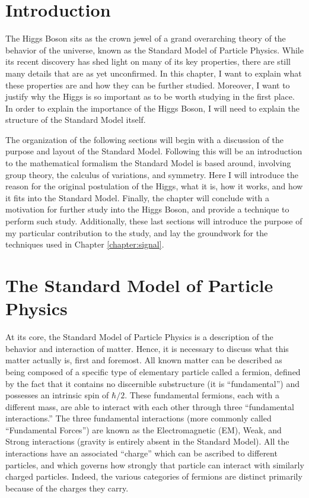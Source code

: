 \section{Introduction}

    The Higgs Boson sits as the crown jewel of a grand overarching theory of the behavior of the universe,
        known as the Standard Model of Particle Physics.
    While its recent discovery has shed light on many of its key properties,
        there are still many details that are as yet unconfirmed.
    In this chapter, I want to explain what these properties are and how they can be further studied.
    Moreover, I want to justify why the Higgs is so important as to be worth studying in the first place.
    In order to explain the importance of the Higgs Boson,
        I will need to explain the structure of the Standard Model itself.

    The organization of the following sections will begin with a discussion of the purpose and layout of the Standard Model.
    Following this will be an introduction to the mathematical formalism the Standard Model is based around,
        involving group theory, the calculus of variations, and symmetry.
    Here I will introduce the reason for the original postulation of the Higgs, what it is, how it works, and how it fits into the Standard Model.
    Finally, the chapter will conclude with a motivation for further study into the Higgs Boson, and provide a technique to perform such study.
    Additionally, these last sections will introduce the purpose of my particular contribution to the study,
        and lay the groundwork for the techniques used in Chapter \ref{chapter:signal}.

\section{The Standard Model of Particle Physics}\label{sec:standard_model}
    
    At its core, the Standard Model of Particle Physics is a description of the behavior and interaction of matter.
    Hence, it is necessary to discuss what this matter actually is, first and foremost.
    All known matter can be described as being composed of a specific type of elementary particle called a fermion,
        defined by the fact that it contains no discernible substructure (it is ``fundamental'')
        and possesses an intrinsic spin of $\hbar/2$.
    These fundamental fermions, each with a different mass, are able to interact with each other through three ``fundamental interactions.''
    The three fundamental interactions (more commonly called ``Fundamental Forces'') are known as
        the Electromagnetic (EM), Weak, and Strong interactions (gravity is entirely absent in the Standard Model).
    All the interactions have an associated ``charge'' which can be ascribed to different particles,
        and which governs how strongly that particle can interact with similarly charged particles.
    Indeed, the various categories of fermions are distinct primarily because of the charges they carry.


